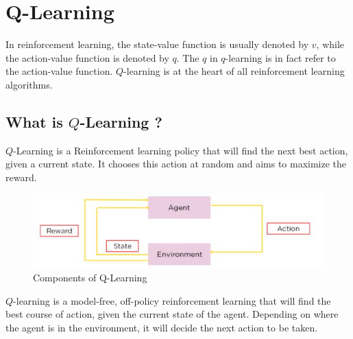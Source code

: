 
\chapter{Q-Learning}





In reinforcement learning, the state-value function is usually denoted by $v$, 
while the action-value function is denoted by $q$.
The $q$ in $q$-learning is in fact refer to the action-value function. 
$Q$-learning is at the heart of all reinforcement learning algorithms.

\section{What is $Q$-Learning ?}

$Q$-Learning is a Reinforcement learning policy that will find the next best action, 
given a current state. It chooses this action at random and aims to maximize the reward.

\begin{figure}[!htb]
\centering
\includegraphics[scale=0.618]{pix/q_learning/3-components-q.jpg}
\caption{Components of Q-Learning}
\end{figure}

$Q$-learning is a model-free, off-policy reinforcement learning that will find the best 
course of action, given the current state of the agent. Depending on where the agent is 
in the environment, it will decide the next action to be taken.

